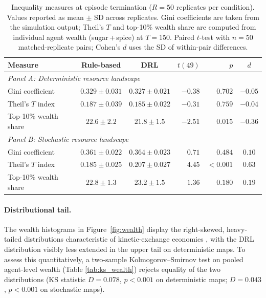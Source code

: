 \documentclass[pdflatex,sn-mathphys-num]{sn-jnl}%
\theoremstyle{thmstyleone}%
\theoremstyle{thmstyletwo}%
\theoremstyle{thmstylethree}%
\begin{document}
\begin{table}[ht]
\centering
\caption{Inequality measures at episode termination ($R = 50$ replicates per condition). Values reported as mean $\pm$ SD across replicates. Gini coefficients are taken from the simulation output; Theil's $T$ and top-10\% wealth share are computed from individual agent wealth (sugar\,+\,spice) at $T = 150$. Paired $t$-test with $n = 50$ matched-replicate pairs; Cohen's $d$ uses the SD of within-pair differences.}
\label{tab:inequality}
\begin{tabular}{lccrrc}
\toprule
\textbf{Measure} & \textbf{Rule-based} & \textbf{DRL} & $t(49)$ & $p$ & $d$ \\
\midrule
\multicolumn{6}{l}{\textit{Panel A: Deterministic resource landscape}} \\[2pt]
Gini coefficient          & $0.329 \pm 0.031$ & $0.327 \pm 0.021$ & $-0.38$ & $0.702$    & $-0.05$ \\
Theil's $T$ index         & $0.187 \pm 0.039$ & $0.185 \pm 0.022$ & $-0.31$ & $0.759$    & $-0.04$ \\
Top-10\% wealth share     & $22.6 \pm 2.2$    & $21.8 \pm 1.5$    & $-2.51$ & $0.015$    & $-0.36$ \\
\midrule
\multicolumn{6}{l}{\textit{Panel B: Stochastic resource landscape}} \\[2pt]
Gini coefficient          & $0.361 \pm 0.022$ & $0.364 \pm 0.023$ & $0.71$  & $0.484$    & $0.10$  \\
Theil's $T$ index         & $0.185 \pm 0.025$ & $0.207 \pm 0.027$ & $4.45$  & $<\!0.001$ & $0.63$  \\
Top-10\% wealth share     & $22.8 \pm 1.3$    & $23.2 \pm 1.5$    & $1.36$  & $0.180$    & $0.19$  \\
\bottomrule
\end{tabular}
\end{table}

\paragraph{Distributional tail.}
The wealth histograms in Figure~\ref{fig:wealth} display the right-skewed, heavy-tailed distributions characteristic of kinetic-exchange economies \citep{Boghosian2014}, with the DRL distribution visibly less extended in the upper tail on deterministic maps.
To assess this quantitatively, a two-sample Kolmogorov--Smirnov test on pooled agent-level wealth (Table \ref{tab:ks_wealth}) rejects equality of the two distributions (KS statistic $D = 0.078$, $p < 0.001$ on deterministic maps; $D = 0.043$, $p < 0.001$ on stochastic maps).
\end{document}

